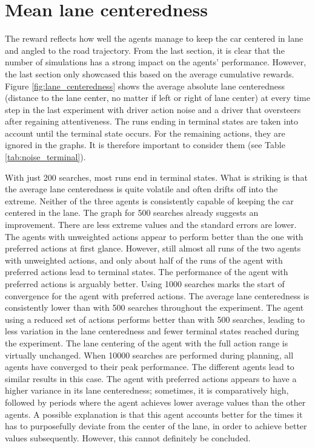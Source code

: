 \section{Mean lane centeredness}


The reward reflects how well the agents manage to keep the car centered in lane and angled to the road trajectory. From the last section, it is clear that the number of simulations has a strong impact on the agents' performance. However, the last section only showcased this based on the average cumulative rewards. Figure \ref{fig:lane_centeredness} shows the average absolute lane centeredness (distance to the lane center, no matter if left or right of lane center) at every time step in the last experiment with driver action noise and a driver that oversteers after regaining attentiveness. The runs ending in terminal states are taken into account until the terminal state occurs. For the remaining actions, they are ignored in the graphs. It is therefore important to consider them (see Table \ref{tab:noise_terminal}). 

With just 200 searches, most runs end in terminal states. What is striking is that the average lane centeredness is quite volatile and often drifts off into the extreme. Neither of the three agents is consistently capable of keeping the car centered in the lane. The graph for 500 searches already suggests an improvement. There are less extreme values and the standard errors are lower. The agents with unweighted actions appear to perform better than the one with preferred actions at first glance. However, still almost all runs of the two agents with unweighted actions, and only about half of the runs of the agent with preferred actions lead to terminal states. The performance of the agent with preferred actions is arguably better. Using 1000 searches marks the start of convergence for the agent with preferred actions. The average lane centeredness is consistently lower than with 500 searches throughout the experiment. The agent using a reduced set of actions performs better than with 500 searches, leading to less variation in the lane centeredness and fewer terminal states reached during the experiment. The lane centering of the agent with the full action range is virtually unchanged. When 10000 searches are performed during planning, all agents have converged to their peak performance. The different agents lead to similar results in this case. The agent with preferred actions appears to have a higher variance in its lane centeredness; sometimes, it is comparatively high, followed by periods where the agent achieves lower average values than the other agents. A possible explanation is that this agent accounts better for the times it has to purposefully deviate from the center of the lane, in order to achieve better values subsequently. However, this cannot definitely be concluded.





